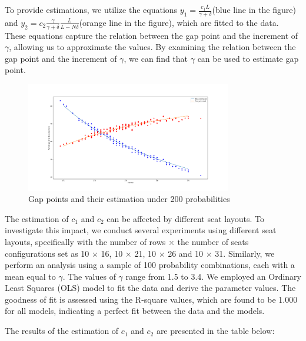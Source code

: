 To provide estimations, we utilize the equations $y_1 = \frac{c_1 L}{\gamma + \delta}$(blue line in the figure) and $y_2 = c_2 \frac{\gamma}{\gamma + \delta} \frac{L}{L-N \delta}$(orange line in the figure), which are fitted to the data. These equations capture the relation between the gap point and the increment of $\gamma$, allowing us to approximate the values. By examining the relation between the gap point and the increment of $\gamma$, we can find that $\gamma$ can be used to estimate gap point.

\begin{figure}[ht]
  \centering
    \includegraphics[width=0.8\textwidth]{./Figures/re2.pdf}
  \caption{Gap points and their estimation under 200 probabilities}
\end{figure}



The estimation of $c_1$ and $c_2$ can be affected by different seat layouts. To investigate this impact, we conduct several experiments using different seat layouts, specifically with the number of rows $\times$ the number of seats configurations set as 10 $\times$ 16, 10 $\times$ 21, 10 $\times$ 26 and 10 $\times$ 31. Similarly, we perform an analysis using a sample of 100 probability combinations, each with a mean equal to $\gamma$. The values of $\gamma$ range from 1.5 to 3.4. We employed an Ordinary Least Squares (OLS) model to fit the data and derive the parameter values. The goodness of fit is assessed using the R-square values, which are found to be 1.000 for all models, indicating a perfect fit between the data and the models.

The results of the estimation of $c_1$ and $c_2$ are presented in the table below:

